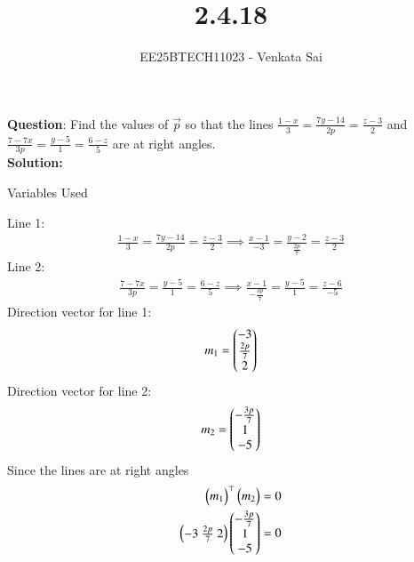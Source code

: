 \documentclass[journal]{IEEEtran}
\begin{document}


\title{2.4.18}
\author{EE25BTECH11023 - Venkata Sai}
{\let\newpage\relax\maketitle}

\renewcommand{\thefigure}{\theenumi}
\renewcommand{\thetable}{\theenumi}
\setlength{\intextsep}{10pt} %


\renewcommand{\thetable}{\theenumi}


\textbf{Question}:\newline
Find the values of $\vec{p}$ so that the lines $\frac{1-x}{3} = \frac{7y-14}{2p} = \frac{z-3}{2}$ and $\frac{7-7x}{3p} = \frac{y-5}{1} = \frac{6-z}{5}$ are at right angles. 
\\
\textbf{Solution: }
\begin{table}[H]    
  \centering
  
  \caption{Variables Used}
\end{table} 
Line 1:
\begin{align}
\frac{1-x}{3} = \frac{7y-14}{2p} = \frac{z-3}{2} \implies \frac{x-1}{-3} = \frac{y-2}{\frac{2p}{7}} = \frac{z-3}{2}
\end{align}
Line 2:
\begin{align}
\frac{7-7x}{3p} = \frac{y-5}{1} = \frac{6-z}{5} \implies \frac{x-1}{-\frac{3p}{7}} = \frac{y-5}{1} = \frac{z-6}{-5}
\end{align}
Direction vector for line 1:
\begin{align}
m_1 = \begin{pmatrix}-3 \\ \frac{2p}{7} \\ 2\end{pmatrix}
\end{align}
Direction vector for line 2:
\begin{align}
m_2 = \begin{pmatrix}-\frac{3p}{7} \\ 1 \\ -5\end{pmatrix}
\end{align}
Since the lines are at right angles
\begin{align}
\begin{pmatrix}m_1\end{pmatrix}^\top\begin{pmatrix}m_2\end{pmatrix} = 0 \\
\begin{pmatrix}-3 \ \frac{2p}{7} \ 2\end{pmatrix}\begin{pmatrix}-\frac{3p}{7} \\ 1 \\ -5\end{pmatrix}=0
\end{align}
\end{document}
